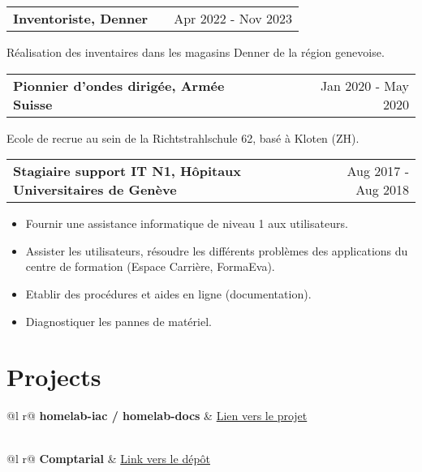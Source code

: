 \documentclass[a4paper,12pt]{article}
\makeatletter
\newenvironment{jobshort}[2]
    {
    \begin{tabularx}{\linewidth}{@{}l X r@{}}
    \textbf{#1} & \hfill &  #2 \\[3.75pt]
    \end{tabularx}
    }
    {
    }
\newenvironment{joblong}[2]
    {
    \begin{tabularx}{\linewidth}{@{}l X r@{}}
    \textbf{#1} & \hfill &  #2 \\[3.75pt]
    \end{tabularx}
    \begin{minipage}[t]{\linewidth}
    \begin{itemize}[nosep,after=\strut, leftmargin=1em, itemsep=3pt,label=--]
    }
    {
    \end{itemize}
    \end{minipage}
    }
\makeatother
\begin{document}
\begin{jobshort}{Inventoriste, Denner}{Apr 2022 - Nov 2023}
    Réalisation des inventaires dans les magasins Denner de la région genevoise.
\end{jobshort}

\begin{jobshort}{Pionnier d’ondes dirigée, Armée Suisse}{Jan 2020 - May 2020}
    Ecole de recrue au sein de la Richtstrahlschule 62, basé à Kloten (ZH).
\end{jobshort}

\begin{joblong}{Stagiaire support IT N1, Hôpitaux Universitaires de Genève}{Aug 2017 - Aug 2018}
\item Fournir une assistance informatique de niveau 1 aux utilisateurs.
\item Assister les utilisateurs, résoudre les différents problèmes des applications du centre de formation (Espace Carrière, FormaEva).
\item Etablir des procédures et aides en ligne (documentation).
\item Diagnostiquer les pannes de matériel.
\end{joblong}

\section{Projects}

\begin{tabularx}{\linewidth}{ @{}l r@{} }
\textbf{homelab-iac / homelab-docs} & \hfill \href{https://boranuzun.github.io/homelab-docs}{Lien vers le projet} \\[3.75pt]
  \\
\end{tabularx}

\begin{tabularx}{\linewidth}{ @{}l r@{} }
\textbf{Comptarial} & \hfill \href{https://github.com/heg-comptarial/comptarial}{Link vers le dépôt} \\[3.75pt]
  \\
\end{tabularx}
\end{document}
